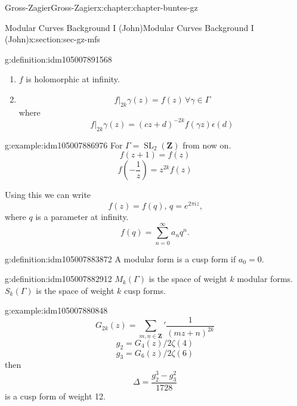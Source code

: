 \documentclass[oneside,10pt,]{book}
\numberwithin{equation}{section}
\newcommand{\ZZ}{\mathbf{Z}}
\DeclareMathOperator{\SL}{SL}
\begin{document}
\begin{chapterptx}{Gross-Zagier}{}{Gross-Zagier}{}{}{x:chapter:chapter-buntes-gz}
\begin{sectionptx}{Modular Curves Background I (John)}{}{Modular Curves Background I (John)}{}{}{x:section:sec-gz-mfs}
\begin{definition}{}{g:definition:idm105007891568}
\begin{enumerate}
\item{}\(f\) is holomorphic at infinity.%
\item{}%
\begin{equation*}
f|_{2k} \gamma (z) = f(z)\,\forall\gamma \in \Gamma 
\end{equation*}
where%
\begin{equation*}
f|_{2k} \gamma (z) = (cz+d)^{-2k}f(\gamma z)\epsilon (d)
\end{equation*}
%
\end{enumerate}
%
\end{definition}
\begin{example}{}{g:example:idm105007886976}%
For \(\Gamma =  \SL_2(\ZZ)\) from now on.%
\begin{equation*}
f(z+1) = f(z)
\end{equation*}
%
\begin{equation*}
f\left(-\frac 1z\right) = z^{2k}f(z)
\end{equation*}
%
\end{example}
Using this we can write%
\begin{equation*}
f(z) = f(q),\,q= e^{2\pi  i z}\text{,}
\end{equation*}
where \(q\) is a parameter at infinity.%
\begin{equation*}
f(q) = \sum_{n=0}^\infty a_n q^n\text{.}
\end{equation*}
%
\begin{definition}{}{g:definition:idm105007883872}%
A modular form is a cusp form if \(a_0 = 0\).%
\end{definition}
\begin{definition}{}{g:definition:idm105007882912}%
\(M_k(\Gamma )\) is the space of weight \(k\) modular forms. \(S_k(\Gamma )\) is the space of weight \(k\) cusp forms.%
\end{definition}
\begin{example}{}{g:example:idm105007880848}%
%
\begin{equation*}
G_{2k}(z) = \sum_{m,n\in \ZZ}' \frac{1}{(mz+n)^{2k}}
\end{equation*}
%
\begin{equation*}
g_{2} = G_4(z)/2\zeta (4)
\end{equation*}
%
\begin{equation*}
g_{3} = G_6(z)/2\zeta (6)
\end{equation*}
then%
\begin{equation*}
\Delta  = \frac{g_2^3 - g_3^2}{1728}
\end{equation*}
is a cusp form of weight 12.%

\end{example}
\end{sectionptx}
\end{chapterptx}
\end{document}
